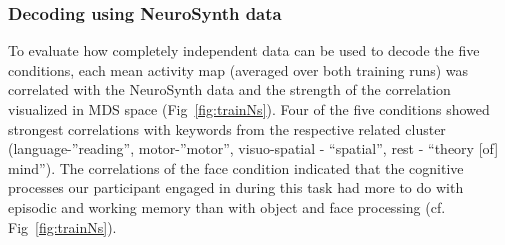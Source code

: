 \documentclass[fleqn,10pt]{SelfArx} %
\begin{document}
\subsubsection*{Decoding using NeuroSynth data}
To evaluate how completely independent data can be used to decode the five conditions, each mean activity map (averaged over both training runs) was correlated with the NeuroSynth data and the strength of the correlation visualized in MDS space (Fig~\ref{fig:trainNs}). Four of the five conditions showed strongest correlations with keywords from the respective related cluster (language-”reading”, motor-”motor”, visuo-spatial - “spatial”, rest - “theory [of] mind”). The correlations of the face condition indicated that the cognitive processes our participant engaged in during this task had more to do with episodic and working memory than with object and face processing (cf. Fig~\ref{fig:trainNs}).
\end{document}
